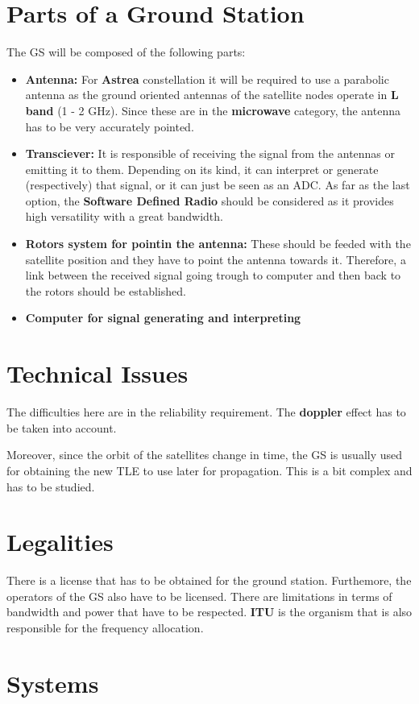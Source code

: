 \documentclass[12pt,a4paper]{article}
\begin{document}
\section{Parts of a Ground Station}
The GS will be composed of the following parts:
\begin{itemize}
\item \textbf{Antenna:} For \textbf{Astrea} constellation it will be required to use a parabolic antenna as the ground oriented antennas of the satellite nodes operate in \textbf{L band} (1 - 2 GHz). Since these are in the \textbf{microwave} category, the antenna has to be very accurately pointed.
\item \textbf{Transciever:} It is responsible of receiving the signal from the antennas or emitting it to them. Depending on its kind, it can interpret or generate (respectively) that signal, or it can just be seen as an ADC. As far as the last option, the \textbf{Software Defined Radio} should be considered as it provides high versatility with a great bandwidth.
\item \textbf{Rotors system for pointin the antenna:} These should be feeded with the satellite position and they have to point the antenna towards it. Therefore, a link between the received signal going trough to computer and then back to the rotors should be established.
\item \textbf{Computer for signal generating and interpreting}
\end{itemize}

\section{Technical Issues}
The difficulties here are in the reliability requirement. The \textbf{doppler} effect has to be taken into account.

Moreover, since the orbit of the satellites change in time, the GS is usually used for obtaining the new TLE to use later for propagation. This is a bit complex and has to be studied.

\section{Legalities}
There is a license that has to be obtained for the ground station.
Furthemore, the operators of the GS also have to be licensed.
There are limitations in terms of bandwidth and power that have to be respected. \textbf{ITU} is the organism that is also responsible for the frequency allocation.
\section{Systems}
\end{document}
